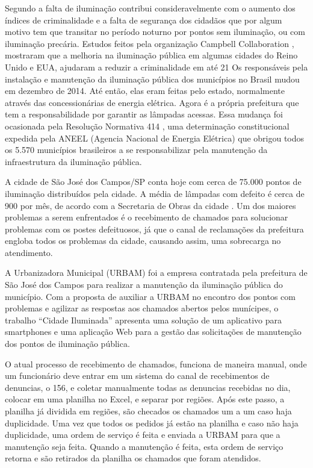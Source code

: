 \documentclass[
	article,			%
	11pt,				%
	oneside,			%
	a4paper,			%
	english,			%
	brazil,				%
	sumario=tradicional
	]{abntex2}
\begin{document}
Segundo \cite{aver} a falta de iluminação contribui consideravelmente com o aumento
dos índices de criminalidade e a falta de segurança dos cidadãos que por algum
motivo tem que transitar no período noturno por pontos sem iluminação, ou com
iluminação precária. Estudos feitos pela organização Campbell Collaboration \cite{newton},
mostraram que a melhoria na iluminação pública em algumas cidades do Reino Unido e EUA, ajudaram a reduzir a criminalidade em até 21%
Os responsáveis pela instalação e manutenção da iluminação pública dos municípios
no Brasil mudou em dezembro de 2014. Até então, elas eram feitas pelo estado,
normalmente através das concessionárias de energia elétrica. Agora é a própria
prefeitura que tem a responsabilidade por garantir as lâmpadas acessas. Essa
mudança foi ocasionada pela Resolução Normativa 414 \cite{aneel414}, uma determinação
constitucional expedida pela ANEEL (Agencia Nacional de Energia Elétrica) que
obrigou todos os 5.570 municípios brasileiros a se responsabilizar pela
manutenção da infraestrutura da iluminação pública.

A cidade de São José dos Campos/SP conta hoje com cerca de 75.000 pontos de iluminação
distribuídos pela cidade. A média de lâmpadas com defeito é cerca de 900 por mês, de
acordo com a Secretaria de Obras da cidade \cite{secretariaobras}. Um dos maiores problemas a
serem enfrentados é o recebimento de chamados para solucionar problemas com os
postes defeituosos, já que o canal de reclamações da prefeitura engloba todos
os problemas da cidade, causando assim, uma sobrecarga no atendimento.

A Urbanizadora Municipal (URBAM) foi a empresa contratada pela prefeitura de
São José dos Campos para realizar a manutenção da iluminação pública do município.
Com a proposta de auxiliar a URBAM no encontro dos pontos com problemas e agilizar
as respostas aos chamados abertos pelos munícipes, o trabalho “Cidade Iluminada”
apresenta uma solução de um aplicativo para smartphones e uma aplicação Web para
a gestão das solicitações de manutenção dos pontos de iluminação pública.

O atual processo de recebimento de chamados, funciona de maneira manual, onde
um funcionário deve entrar em um sistema do canal de recebimentos de denuncias,
o 156, e coletar manualmente todas as denuncias recebidas no dia, colocar em uma
planilha no Excel, e separar por regiões. Após este passo, a planilha já
dividida em regiões, são checados os chamados um a um caso haja duplicidade.
Uma vez que todos os pedidos já estão na planilha e caso não haja duplicidade,
uma ordem de serviço é feita e enviada a URBAM para que a manutenção seja feita.
Quando a manutenção é feita, esta ordem de serviço retorna e são retirados da
planilha os chamados que foram atendidos.
\end{document}

